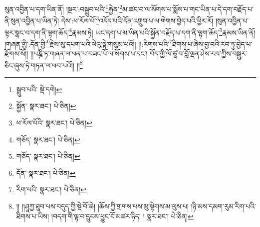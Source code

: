 སུན་འབྱིན་པ་དག་ཡིན་ནོ། །སྔར་:བསྒྲུབ་པའི་\footnote{སྒྲུབ་པའི་  སྡེ་དགེ། }རྐྱེན་\footnote{སྐྱོན་  སྣར་ཐང་།  པེ་ཅིན། }མ་ཚང་བ་ལ་སོགས་པ་སྨོས་པ་གང་ཡིན་པ་དེ་དག་བརྗོད་པ་ནི་སུན་འབྱིན་པ་ཡིན་ཏེ། དེས་:ཕ་རོལ་པོ་\footnote{ཕ་རོལ་པོའི་  སྣར་ཐང་།  པེ་ཅིན། }འདོད་པའི་དོན་འགྲུབ་པ་ལ་གེགས་བྱེད་པའི་ཕྱིར་རོ། །སུན་འབྱིན་པ་ལྟར་སྣང་བ་དག་ནི་ལྟག་ཆོད་\footnote{གཅོད་  སྣར་ཐང་།  པེ་ཅིན། }རྣམས་ཏེ། ཡང་དག་པ་མ་ཡིན་པའི་སྐྱོན་བརྗོད་པ་དག་ནི་ལྟག་ཆོད་\footnote{གཅོད་  སྣར་ཐང་།  པེ་ཅིན། }རྣམས་ཡིན་ནོ། །གཞན་གྱི་:དོན་གྱི་\footnote{དོན་  སྣར་ཐང་།  པེ་ཅིན། }རྗེས་སུ་དཔག་པའི་ལེའུ་སྟེ་གསུམ་པའོ།། །།:རིགས་པའི་\footnote{རིག་པའི་  སྣར་ཐང་།  པེ་ཅིན། }ཐིགས་པ་ཞེས་བྱ་བའི་རབ་ཏུ་བྱེད་པ་རྫོགས་སོ།། །།པཎྜི་ཏ་གཞན་ལ་ཕན་པ་བཟང་པོ་ལ་སོགས་པ་དང་། བོད་ཀྱི་ལོ་ཙཱ་བ་བློ་ལྡན་ཤེས་རབ་ཀྱིས་བསྒྱུར་ཅིང་ཞུས་ཏེ་གཏན་ལ་ཕབ་པའོ།། །།\footnote{།། །།ཤཱཀྱ་ཐུབ་པས་བདུད་ཀྱི་སྡེ་བོ་ཆེ། །ཆོས་ཀྱི་གྲགས་པས་མུ་སྟེགས་མ་ལུས་པ། །ཉི་མས་དམག་རུམ་རིག་པའི་ཐིགས་པ་ཡིས། །བདག་གི་ལྟ་བ་དྲུངས་ཕྱུང་ངོ་མཚར་ཉིད། །  སྣར་ཐང་།  པེ་ཅིན། }
